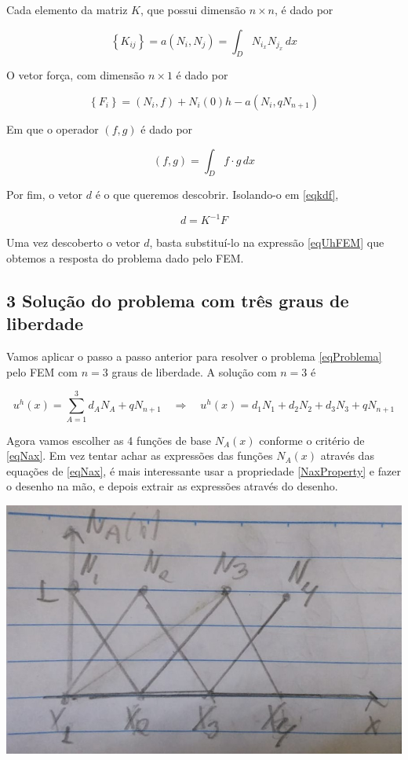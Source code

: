 \documentclass[12pt]{scrartcl}
\newcommand{\logo}{\quad \Rightarrow \quad}
\begin{document}
Cada elemento da matriz $K$, que possui dimensão $n \times  n$, é dado por

\[
    \left\{K_{ij}\right\} = a\left(N_i, N_j\right) = \int_{D} N_{i_x} N_{j_x} \, dx
\] 

O vetor força, com dimensão $n \times 1$ é dado por

\[
    \left\{F_{i}\right\} = \left(N_i, f\right) + N_i(0)h - a\left(N_i, qN_{n+1}\right)
\] 

Em que o operador $\left(f, g\right)$ é dado por

\[
    \left(f, g\right) = \int_{D} f \cdot g \, dx
\] 

Por fim, o vetor $d$ é o que queremos descobrir. Isolando-o em \eqref{eqkdf},

\begin{equation}\label{eqdkf}
    d = K^{-1}F
\end{equation}

Uma vez descoberto o vetor $d$, basta substituí-lo na expressão \eqref{eqUhFEM} que obtemos a resposta do problema dado pelo FEM.

\subsection*{3 Solução do problema com três graus de liberdade}

Vamos aplicar o passo a passo anterior para resolver o problema \eqref{eqProblema} pelo FEM com $n = 3$ graus de liberdade.
A solução com $n = 3$ é  

\[
    u^h(x) = \sum_{A=1}^3 d_AN_A + qN_{n+1}
    \logo
    u^h(x) = d_1N_1 + d_2N_2 + d_3N_3 + qN_{n+1}
\] 

Agora vamos escolher as 4 funções de base $N_A(x)$ conforme o critério de \eqref{eqNax}. Em vez tentar achar as expressões das funções
$N_A(x)$ através das equações de \eqref{eqNax}, é mais interessante usar a propriedade \eqref{NaxProperty} e fazer o desenho na mão,
e depois extrair as expressões através do desenho.

\begin{center}
    \includegraphics[scale=0.5]{AA03_Nax.jpeg}
\end{center}
\end{document}
